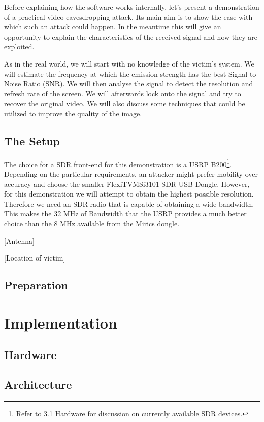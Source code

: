 \documentclass[a4paper,12pt,twoside,openright]{report}
\begin{document}
Before explaining how the software works internally, let's present a demonstration of a practical video eavesdropping attack. Its main aim is to show the ease with which such an attack could happen. In the meantime this will give an opportunity to explain the characteristics of the received signal and how they are exploited.

As in the real world, we will start with no knowledge of the victim's system. We will estimate the frequency at which the emission strength has the best Signal to Noise Ratio (SNR). We will then analyse the signal to detect the resolution and refresh rate of the screen. We will afterwards lock onto the signal and try to recover the original video. We will also discuss some techniques that could be utilized to improve the quality of the image.

\section{The Setup}

The choice for a SDR front-end for this demonstration is a USRP B200\footnote{Refer to \ref{sec:hw} Hardware for discussion on currently available SDR devices.}. Depending on the particular requirements, an attacker might prefer mobility over accuracy and choose the smaller FlexiTV\texttrademark MSi3101 SDR USB Dongle. However, for this demonstration we will attempt to obtain the highest possible resolution. Therefore we need an SDR radio that is capable of obtaining a wide bandwidth. This makes the 32 MHz of Bandwidth that the USRP provides a much better choice than the 8 MHz available from the Mirics dongle.

[Antenna]

[Location of victim]

\section{Preparation}


\chapter{Implementation} 

\section{Hardware}
\label{sec:hw} 

\section{Architecture}
\end{document}

